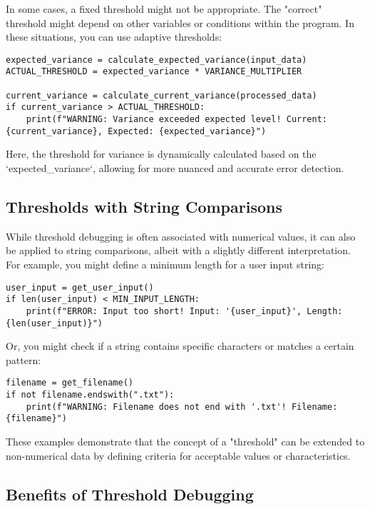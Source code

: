 \documentclass{article}
\begin{document}
{{{In some cases, a fixed threshold might not be appropriate. The "correct" threshold might depend on other variables or conditions within the program. In these situations, you can use adaptive thresholds:

\begin{verbatim}
expected_variance = calculate_expected_variance(input_data)
ACTUAL_THRESHOLD = expected_variance * VARIANCE_MULTIPLIER

current_variance = calculate_current_variance(processed_data)
if current_variance > ACTUAL_THRESHOLD:
    print(f"WARNING: Variance exceeded expected level! Current: {current_variance}, Expected: {expected_variance}")
\end{verbatim}

Here, the threshold for variance is dynamically calculated based on the `expected_variance`, allowing for more nuanced and accurate error detection.

\subsection*{Thresholds with String Comparisons}

While threshold debugging is often associated with numerical values, it can also be applied to string comparisons, albeit with a slightly different interpretation. For example, you might define a minimum length for a user input string:

\begin{verbatim}
user_input = get_user_input()
if len(user_input) < MIN_INPUT_LENGTH:
    print(f"ERROR: Input too short! Input: '{user_input}', Length: {len(user_input)}")
\end{verbatim}

Or, you might check if a string contains specific characters or matches a certain pattern:

\begin{verbatim}
filename = get_filename()
if not filename.endswith(".txt"):
    print(f"WARNING: Filename does not end with '.txt'! Filename: {filename}")
\end{verbatim}

These examples demonstrate that the concept of a "threshold" can be extended to non-numerical data by defining criteria for acceptable values or characteristics.

\subsection*{Benefits of Threshold Debugging}

}}}
\end{document}
